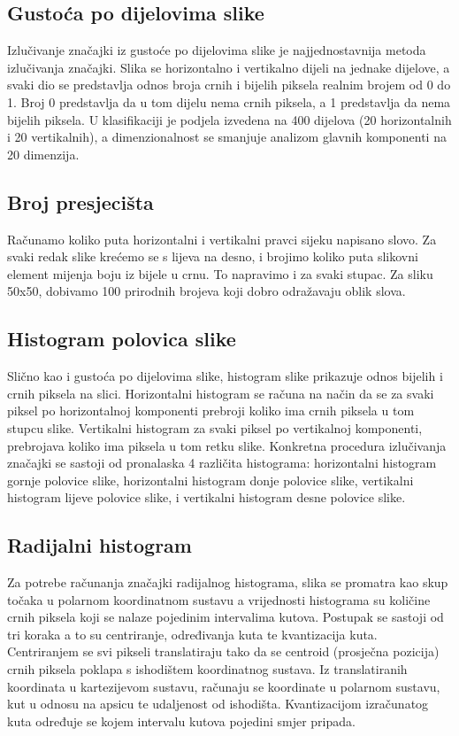\documentclass[a4paper,twocolumn,dvipdfm]{article}
\begin{document}
\subsection{Gustoća po dijelovima slike}
Izlučivanje značajki iz gustoće po dijelovima slike je najjednostavnija metoda
izlučivanja značajki. Slika se horizontalno i vertikalno dijeli na jednake
dijelove, a svaki dio se predstavlja odnos broja crnih i bijelih piksela realnim
brojem od 0 do 1. Broj 0 predstavlja da u tom dijelu nema crnih piksela, a 1
predstavlja da nema bijelih piksela. U klasifikaciji je podjela izvedena na 400
dijelova (20 horizontalnih i 20 vertikalnih), a dimenzionalnost se smanjuje
analizom glavnih komponenti na 20 dimenzija.

\subsection{Broj presjecišta}
Računamo koliko puta horizontalni i vertikalni pravci sijeku napisano slovo.
Za svaki redak slike krećemo se s lijeva na desno, i brojimo koliko puta slikovni element mijenja boju iz bijele u crnu.
To napravimo i za svaki stupac. Za sliku 50x50, dobivamo 100 prirodnih brojeva koji dobro odražavaju oblik slova.

\subsection{Histogram polovica slike}
Slično kao i gustoća po dijelovima slike, histogram slike prikazuje odnos 
bijelih i crnih piksela na slici. Horizontalni histogram se računa na način 
da se za svaki piksel po horizontalnoj komponenti prebroji koliko ima crnih 
piksela u tom stupcu slike. Vertikalni histogram za svaki piksel po vertikalnoj 
komponenti, prebrojava koliko ima piksela u tom retku slike. Konkretna 
procedura izlučivanja značajki se sastoji od pronalaska 4 različita histograma: 
horizontalni histogram gornje polovice slike, horizontalni histogram donje 
polovice slike, vertikalni histogram lijeve polovice slike, i vertikalni 
histogram desne polovice slike.

\subsection{Radijalni histogram}
Za potrebe računanja značajki radijalnog histograma, slika se promatra kao skup točaka u polarnom koordinatnom sustavu a vrijednosti histograma su količine crnih piksela koji se nalaze pojedinim intervalima kutova. Postupak se sastoji od tri koraka a to su centriranje, određivanja kuta te kvantizacija kuta. Centriranjem se svi pikseli translatiraju tako da se centroid (prosječna pozicija) crnih piksela poklapa s ishodištem koordinatnog sustava. Iz translatiranih koordinata u kartezijevom sustavu, računaju se koordinate u polarnom sustavu, kut u odnosu na apsicu te udaljenost od ishodišta. Kvantizacijom izračunatog kuta određuje se kojem intervalu kutova pojedini smjer pripada.
\end{document}

